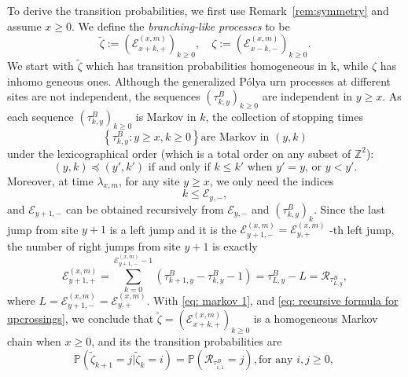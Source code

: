 \documentclass[twoside,12pt,a4paper]{article}
\numberwithin{equation}{section}
\begin{document}
		
		To derive the transition probabilities, we first use Remark~\ref{rem:symmetry} and assume $x \ge 0$. We define the \textit{branching-like processes} to be
		\[
			\tilde{\zeta} := \left(\mathcal{E}^{(x,m)}_{x+k,+} \right)_{k\geq 0}, \quad
			\zeta := \left(\mathcal{E}^{(x,m)}_{x-k,-} \right)_{k\geq 0}
			.\]
			We start with $\tilde{\zeta}$ which has transition probabilities homogeneous in k, while $\zeta$ has inhomo
			geneous ones. Although the generalized P\'{o}lya urn processes at different sites are not independent, the sequences $(\tau^B_{k,y})_{k\geq 0} $ are independent in $y \geq x$. As each sequence $\left(\tau^B_{k,y}\right)_{k\geq 0} $ is Markov in $k$,  the collection of stopping times  
			\begin{equation}\label{eq: markov 1} 
				\left\{\tau^B_{k,y}: y\geq x, k\geq 0 \right\} \mbox{are Markov in $(y,k)$}
			\end{equation}
			under the lexicographical order (which is a total order on any subset of $\mathbb{Z}^2$): 
			\begin{equation}\label{eq: lexicographical order}
				(y,k) \preceq (y',k')  \mbox{ if and only if  }
				k \leq k'   \mbox{ when $y' = y$,  or }   
				y <y'. 
			\end{equation} 
			Moreover, at time $\lambda_{x,m}$, for any site $y\geq x$, we only need the indices 
			$$
			k\leq \mathcal{E}_{y,-},
			$$
			and $\mathcal{E}_{y+1,-}$ can be obtained recursively from $\mathcal{E}_{y,-}$ and $(\tau^B_{k,y})_{k}$. Since the last jump from site $y+1$ is a left jump and it is the $\mathcal{E}_{y+1,-}^{(x,m)}=\mathcal{E}_{y,+}^{(x,m)}$ -th left jump, the number of right jumps from site $y+1$ is exactly
		\begin{equation} \label{eq: recursive formula for upcrossings}
			\mathcal{E}_{y+1,+}^{(x,m)}	=  \sum_{k= 0 }^{\mathcal{E}_{y+1,-}^{(x,m)}-1}	\left(\tau^B_{k+1,y}-\tau^B_{k,y}-1 \right) = \tau^B_{ L,y } - L = \mathcal{R}_{\tau^B_{ L,y }},
		\end{equation}  
	   where $L = \mathcal{E}_{y+1,-}^{(x,m)}=\mathcal{E}_{y,+}^{(x,m)} $. With \eqref{eq: markov 1}, and \eqref{eq: recursive formula for upcrossings}, we conclude that $\tilde{\zeta} = \left(\mathcal{E}^{(x,m)}_{x+k,+} \right)_{k\geq 0}$ is a homogeneous Markov chain when $x\geq 0$, and its the transition probabilities are 
	   	\begin{equation}\label{eq: transition prob on positive}
	   	\mathbb{P}\left(\tilde{\zeta}_{k+1}=j \vert \tilde{\zeta}_k =i  \right) = 
	   	\mathbb{P}\left( \mathcal{R}_{\tau_{i,1}^B} = j \right), \mbox{for any $i,j\geq 0$, } 
	   \end{equation} 
\end{document}

